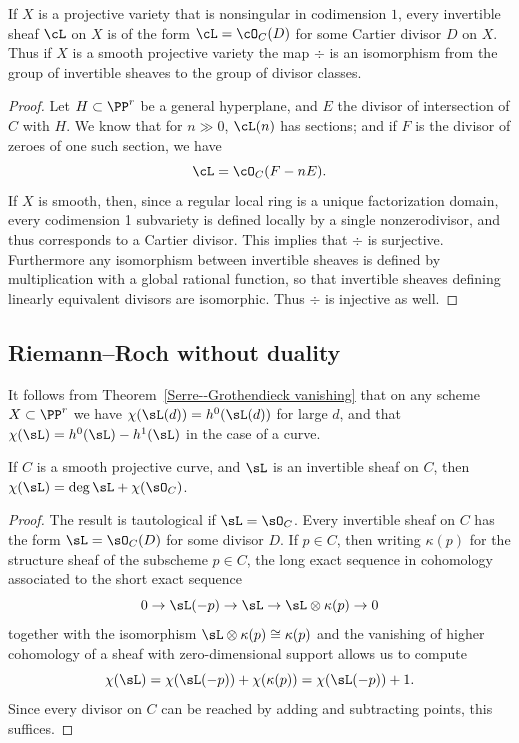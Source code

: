 \begin{corollary}\label{invertible sheaves and divisors}
If $X$ is a projective variety that is nonsingular in codimension $1$,
every invertible sheaf $\cL$ on $X$ is of the form $\cL =\cO_C(D)$ for some 
%
Cartier divisor $D$ on $X$. Thus if $X$ is a smooth projective variety
%
the map $\div$ is an isomorphism from the group of invertible sheaves
to the group 
of divisor classes.
\end{corollary}

\begin{proof}
Let $H \subset \PP^r$ be a general hyperplane, and $E$  the divisor  of intersection of $C$ with $H$. We know that for $n \gg 0$, $\cL(n)$ has sections; and if $F$ is the divisor of zeroes of one such section, we have
$$
\cL = \cO_C(F - nE).
$$
If $X$ is smooth, then, since a regular local ring is a unique
factorization domain, every codimension 1 subvariety is defined locally 
by a single nonzerodivisor, and thus corresponds to a Cartier divisor.
This implies that $\div$ is surjective. Furthermore any 
isomorphism between invertible sheaves
%
is defined by multiplication with a global rational function, so that invertible sheaves defining linearly equivalent divisors are
isomorphic. Thus $\div$ is injective as well.
\end{proof}

\subsection*{Riemann--Roch without duality}

It follows from Theorem~\ref{Serre--Grothendieck vanishing} that on
any scheme $X\subset \PP^r$ we have $\chi(\sL(d)) = h^0(\sL(d))$ for
large $d$, 
and that $\chi(\sL) = h^0(\sL) - h^1(\sL)$ in the case of a curve.

\begin{theorem}\label{easy RR}
If $C$ is a smooth projective curve, and $\sL$ is an invertible sheaf on $C$, then $\chi(\sL) = \deg \sL + \chi(\sO_C)$.
%
\end{theorem}

\begin{proof}
 The result is tautological if $\sL = \sO_C$. Every invertible sheaf on $C$ has the form $\sL = \sO_C(D)$ for some
divisor $D$. If $p\in C$, then writing $\kappa(p)$ for the
structure sheaf of the subscheme $p\in C$, the long exact sequence in cohomology
associated to the short exact sequence
$$
0\to \sL(-p) \to \sL \to \sL\otimes \kappa(p)\to 0
$$
together with the isomorphism $\sL\otimes \kappa(p) \cong \kappa(p)$
and the vanishing of higher cohomology of a sheaf with zero-dimensional support allows us to compute 
$$
\chi(\sL) = \chi(\sL(-p)) + \chi(\kappa(p)) = \chi(\sL(-p)) + 1.
$$
Since every divisor on $C$ can be reached by adding and subtracting points, this suffices.
\end{proof}

